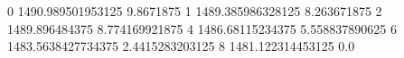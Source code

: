 0 1490.989501953125 9.8671875
1 1489.385986328125 8.263671875
2 1489.896484375 8.774169921875
4 1486.68115234375 5.558837890625
6 1483.5638427734375 2.4415283203125
8 1481.122314453125 0.0
